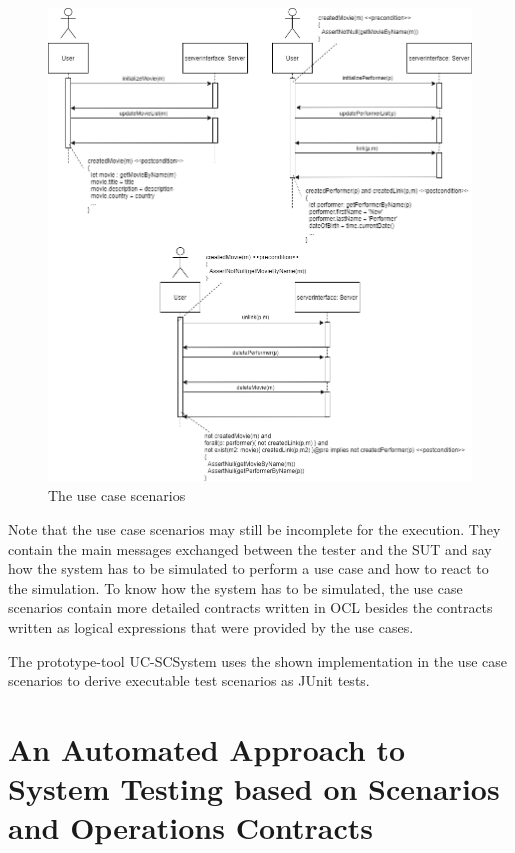 \begin{figure}[h]
	\centering
	\includegraphics[width=1.0\textwidth]{../images/topic3_ucs.png}
	\caption{The use case scenarios}
	\label{ucs}
\end{figure}

\newpage
Note that the use case scenarios may still be incomplete for the execution. They contain the main messages exchanged between the tester and the SUT and say how the system has to be simulated to perform a use case and how to react to the simulation. To know how the system has to be simulated, the use case scenarios contain more detailed contracts written in OCL besides the contracts written as logical expressions that were provided by the use cases. 

The prototype-tool UC-SCSystem uses the shown implementation in the use case scenarios to derive executable test scenarios as JUnit tests.

\section{An Automated Approach to System Testing based on Scenarios and Operations Contracts} \label{approachtwo}

